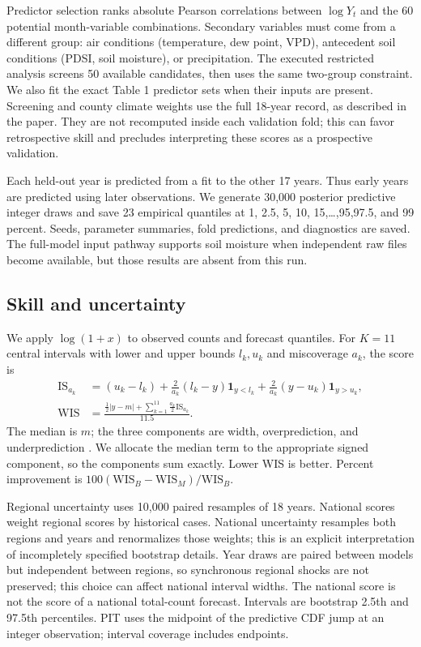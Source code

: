 \documentclass[11pt]{article}
\begin{document}
Predictor selection ranks absolute Pearson correlations between $\log Y_t$ and
the 60 potential month-variable combinations. Secondary variables must come from
a different group: air conditions (temperature, dew point, VPD), antecedent soil
conditions (PDSI, soil moisture), or precipitation. The executed restricted analysis
screens 50 available candidates, then uses the same two-group constraint. We also
fit the exact Table 1 predictor sets when their inputs are present. Screening and
county climate weights use the full 18-year record, as described in the paper.
They are not recomputed inside each validation fold; this can favor retrospective
skill and precludes interpreting these scores as a prospective validation.

Each held-out year is predicted from a fit to the other 17 years. Thus early years
are predicted using later observations. We generate 30,000 posterior predictive
integer draws and save 23 empirical quantiles at 1, 2.5, 5, 10, 15,\ldots,95,97.5,
and 99 percent. Seeds, parameter summaries, fold predictions, and diagnostics are
saved. The full-model input pathway supports soil moisture when independent raw
files become available, but those results are absent from this run.

\subsection{Skill and uncertainty}
We apply $\log(1+x)$ to observed counts and forecast quantiles. For $K=11$ central
intervals with lower and upper bounds $l_k,u_k$ and miscoverage $a_k$, the score is
\begin{align}
\mathrm{IS}_{a_k}&=(u_k-l_k)+\frac{2}{a_k}(l_k-y)\mathbf{1}_{y<l_k}
 +\frac{2}{a_k}(y-u_k)\mathbf{1}_{y>u_k},\\
\mathrm{WIS}&=\frac{\frac12|y-m|+\sum_{k=1}^{11}\frac{a_k}{2}\mathrm{IS}_{a_k}}{11.5}.
\end{align}
The median is $m$; the three components are width, overprediction, and
underprediction \citep{bracher}. We allocate the median term to the appropriate
signed component, so the components sum exactly. Lower WIS is better.
Percent improvement is $100(\mathrm{WIS}_{B}-\mathrm{WIS}_{M})/\mathrm{WIS}_{B}$.

Regional uncertainty uses 10,000 paired resamples of 18 years. National scores
weight regional scores by historical cases. National uncertainty resamples both
regions and years and renormalizes those weights; this is an explicit interpretation
of incompletely specified bootstrap details. Year draws are paired between models
but independent between regions, so synchronous regional shocks are not preserved;
this choice can affect national interval widths. The national score is not the score
of a national total-count forecast. Intervals are bootstrap 2.5th and 97.5th
percentiles. PIT uses the midpoint of the predictive CDF jump at an integer
observation; interval coverage includes endpoints.
\end{document}
